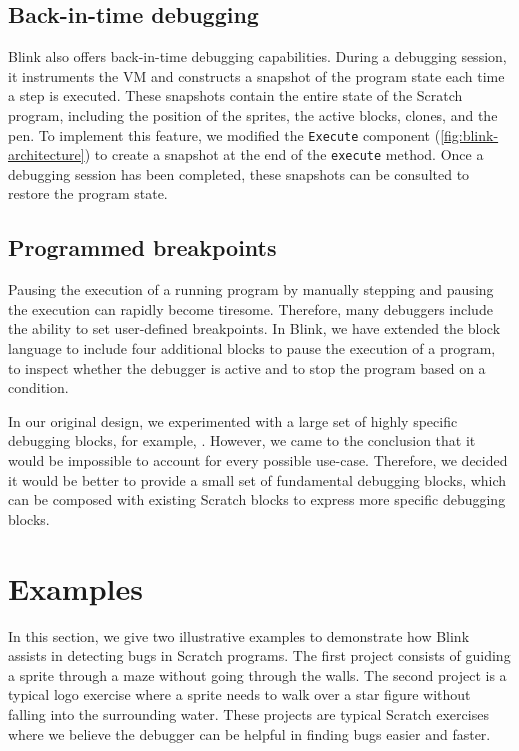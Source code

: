 \documentclass[../main]{subfiles}
\begin{document}
\subsection{Back-in-time debugging}\label{subsec:arch-back-in-time-debugging}
Blink also offers back-in-time debugging capabilities.
During a debugging session, it instruments the VM and constructs a snapshot of the program state each time a step is executed.
These snapshots contain the entire state of the Scratch program, including the position of the sprites, the active blocks, clones, and the pen.
To implement this feature, we modified the \texttt{Execute} component (\cref{fig:blink-architecture}) to create a snapshot at the end of the \texttt{execute} method.
Once a debugging session has been completed, these snapshots can be consulted to restore the program state.

\subsection{Programmed breakpoints}\label{subsec:arch-programmed-breakpoints}
Pausing the execution of a running program by manually stepping and pausing the execution can rapidly become tiresome.
Therefore, many debuggers include the ability to set user-defined breakpoints.
In Blink, we have extended the block language to include four additional blocks to pause the execution of a program, to inspect whether the debugger is active and to stop the program based on a condition.

In our original design, we experimented with a large set of highly specific debugging blocks, for example, .
However, we came to the conclusion that it would be impossible to account for every possible use-case.
Therefore, we decided it would be better to provide a small set of fundamental debugging blocks, which can be composed with existing Scratch blocks to express more specific debugging blocks.

\section{Examples}\label{sec:blink-illustrative-examples}

In this section, we give two illustrative examples to demonstrate how Blink assists in detecting bugs in Scratch programs.
The first project consists of guiding a sprite through a maze without going through the walls.
The second project is a typical logo exercise where a sprite needs to walk over a star figure without falling into the surrounding water.
These projects are typical Scratch exercises where we believe the debugger can be helpful in finding bugs easier and faster.
\end{document}
